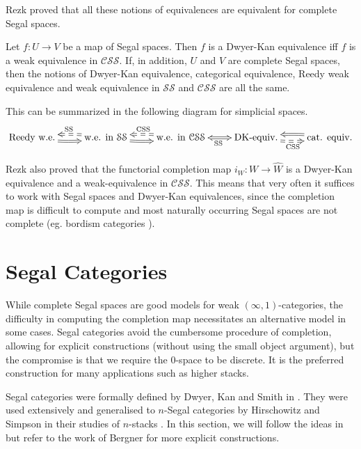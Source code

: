 \begin{refsection}
Rezk \cite[Sec.~7,13,14]{rezk-a-model-for-the-homotopy-theory-of-homotopy-theories} proved that all these notions of equivalences are equivalent for complete Segal spaces.
\begin{thm}\label{thm dk reedy}
Let $f:U\to V$ be a map of Segal spaces. Then $f$ is a Dwyer-Kan equivalence iff $f$ is a weak equivalence in $\mathcal{CSS}$. If, in addition, $U$ and $V$ are complete Segal spaces, then the notions of Dwyer-Kan equivalence, categorical equivalence, Reedy weak equivalence and weak equivalence in $\mathcal{SS}$ and $\mathcal{CSS}$ are all the same.
\end{thm}

This can be summarized in the following diagram for simplicial spaces.
$$\xymatrix{\text{Reedy w.e.}\ar@{=>}@/_.3pc/[r]&\text{w.e. in }\mathcal{SS}\ar@{==>}@/_.3pc/[l]_{\text{SS}}\ar@{=>}@/_.3pc/[r]&\text{w.e. in }\mathcal{CSS}\ar@{==>}@/_.3pc/[l]_{\text{CSS}}\ar@{<=>}[r]_{\text{SS}}&\text{DK-equiv.}\ar@{==>}@/_.3pc/[r]_{\text{CSS}}&\text{cat. equiv.}\ar@{=>}@/_.3pc/[l]}$$

Rezk also proved that the functorial completion map $i_W:W\to\widehat W$ is a Dwyer-Kan equivalence and a weak-equivalence in $\mathcal{CSS}$. This means that very often it suffices to work with Segal spaces and Dwyer-Kan equivalences, since the completion map is difficult to compute and most naturally occurring Segal spaces are not complete (eg. bordism categories \cite{lurie-classification-topological-field-theories}).

\section{Segal Categories}
While complete Segal spaces are good models for weak $(\infty,1)$-categories, the difficulty in computing the completion map necessitates an alternative model in some cases. Segal categories avoid the cumbersome procedure of completion, allowing for explicit constructions (without using the small object argument), but the compromise is that we require the 0-space to be discrete. It is the preferred construction for many applications such as higher stacks.

Segal categories were formally defined by Dwyer, Kan and Smith in \cite{dwyer-kan-smith-homotopy-commutative-diagrams-and-their-realizations}. They were used extensively and generalised to $n$-Segal categories by Hirschowitz and Simpson in their studies of $n$-stacks \cite{hirschowitz-simpson-descente-pour-les-n-champs}. In this section, we will follow the ideas in \cite{hirschowitz-simpson-descente-pour-les-n-champs} but refer to the work of Bergner \cite{bergner-three-models-for-the-homotopy-theory-of-homotopy-theories} for more explicit constructions.


\end{refsection}
